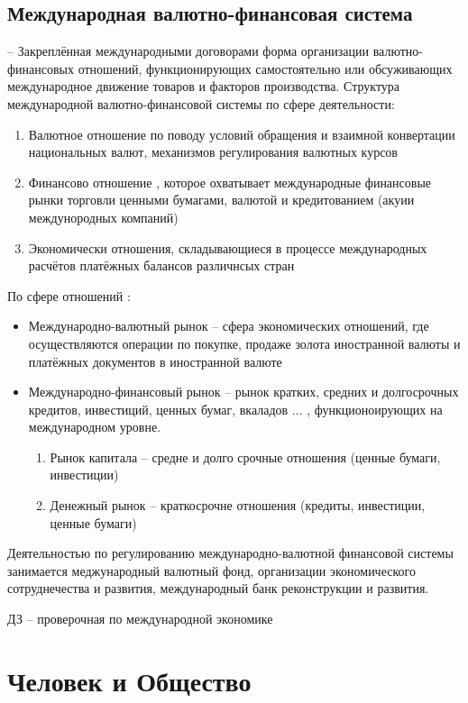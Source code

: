 \documentclass[12pt,a4paper]{book}
\begin{document}
\section{Международная валютно-финансовая система}
-- Закреплённая международными договорами форма организации валютно-финансовых отношений, функционирующих самостоятельно или обсуживающих международное движение товаров и факторов производства.
Структура международной валютно-финансовой системы  по сфере деятельности:
\begin{enumerate}
	\item Валютное отношение по поводу условий обращения и взаимной конвертации национальных валют, механизмов регулирования валютных курсов  
	\item Финансово отношение , которое охватывает международные финансовые рынки торговли ценными бумагами, валютой и кредитованием (акуии междунородных компаний)
	\item Экономически отношения, складывающиеся в процессе международных расчётов платёжных балансов различнсых стран
\end{enumerate}
По сфере отношений :
\begin{itemize}
	\item Международно-валютный рынок -- сфера экономических отношений, где осуществляются операции по покупке, продаже золота иностранной валюты и платёжных документов в иностранной валюте 
		\item Международно-финансовый рынок -- рынок кратких, средних и долгосрочных кредитов, инвестиций, ценных бумаг, вкаладов ... , функционоирующих на международном уровне.	
	\begin{enumerate}
		\item Рынок капитала -- средне и долго срочные отношения (ценные бумаги, инвестиции)
		\item Денежный рынок -- краткосрочне отношения (кредиты, инвестиции, ценные бумаги)
	\end{enumerate}
\end{itemize}
Деятельностью по регулированию международно-валютной финансовой системы занимается меджународный валютный фонд, организации экономического сотруднечества и развития, международный банк реконструкции и развития.

{\hw ДЗ -- проверочная по международной экономике}
\chapter{Человек и Общество}
\end{document}
